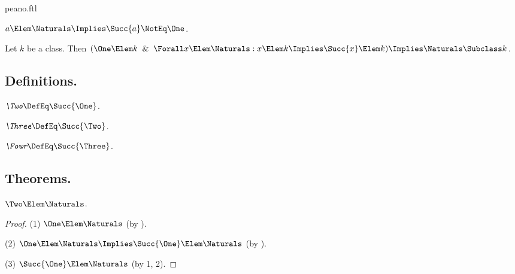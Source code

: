 \documentclass{stex}
\begin{document}
\begin{smodule}{peano.ftl}
\begin{forthel}
  \begin{axiom*}[title=8,name=P8]
    $a \Elem \Naturals \Implies \Succ{a} \NotEq \One$.
  \end{axiom*}
  
  \begin{axiom*}[title=9,name=P9]
    Let $k$ be a class.
    Then $(\One \Elem k \And \Forall x \Elem \Naturals: x \Elem k \Implies \Succ{x} \Elem k) \Implies\linebreak \Naturals \Subclass k$.
  \end{axiom*}
\end{forthel}


\subsection{Definitions.}

\begin{forthel}
  \begin{definition*}[title=10.i,for=Two]
    $\emph{\Two} \DefEq \Succ{\One}$.
  \end{definition*}

  \begin{definition*}[title=10.ii,for=Three]
    $\emph{\Three} \DefEq \Succ{\Two}$.
  \end{definition*}
  
  \begin{definition*}[title=10.iii,for=Four]
    $\emph{\Four} \DefEq \Succ{\Three}$.
  \end{definition*}
\end{forthel}


\subsection{Theorems.}


\begin{forthel}
  \begin{theorem*}[title=11,name=P11]
    $\Two \Elem \Naturals$.
  \end{theorem*}
  \begin{proof}
    (1) $\One \Elem \Naturals$ (by ).

    (2) $\One \Elem \Naturals \Implies \Succ{\One} \Elem \Naturals$ (by ).

    (3) $\Succ{\One} \Elem \Naturals$ (by 1, 2).


\end{proof}
\end{forthel}
\end{smodule}
\end{document}
